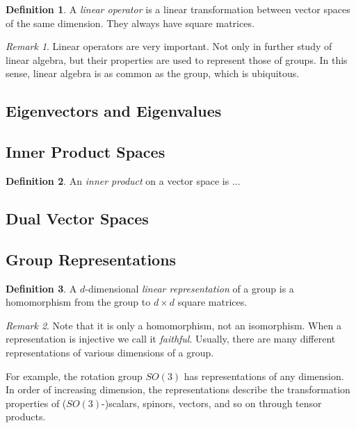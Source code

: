 \documentclass[12pt]{article}
\theoremstyle{definition}
\newtheorem{definition}{Definition}[section]
\theoremstyle{remark}
\newtheorem*{remark}{Remark}
\theoremstyle{example}
\begin{document}
\begin{definition}
	A \textit{linear operator} is a linear transformation between vector spaces of the same dimension. They always have square matrices.
\end{definition}

\begin{remark}
	Linear operators are very important. Not only in further study of linear algebra, but their properties are used to represent those of groups. In this sense, linear algebra is as common as the group, which is ubiquitous.
\end{remark}

\subsection{Eigenvectors and Eigenvalues}

\subsection{Inner Product Spaces}

\begin{definition}
	An \textit{inner product} on a vector space is ...
\end{definition}

\subsection{Dual Vector Spaces}

\subsection{Group Representations}

\begin{definition}
	A $d$-dimensional \textit{linear representation} of a group is a homomorphism from the group to $d\times d$ square matrices.
\end{definition}

\begin{remark}
	Note that it is only a homomorphism, not an isomorphism. When a representation is injective we call it \textit{faithful}. Usually, there are many different representations of various dimensions of a group.
	
	For example, the rotation group $SO(3)$ has representations of any dimension. In order of increasing dimension, the representations describe the transformation properties of ($SO(3)$-)scalars, spinors, vectors, and so on through tensor products.
\end{remark}
\end{document}
